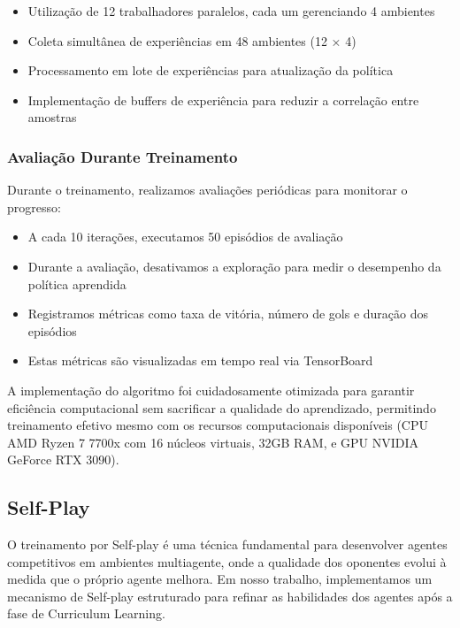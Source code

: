 \begin{itemize}
    \item Utilização de 12 trabalhadores paralelos, cada um gerenciando 4 ambientes
    \item Coleta simultânea de experiências em 48 ambientes (12 × 4)
    \item Processamento em lote de experiências para atualização da política
    \item Implementação de buffers de experiência para reduzir a correlação entre amostras
\end{itemize}

\subsubsection{Avaliação Durante Treinamento}

Durante o treinamento, realizamos avaliações periódicas para monitorar o progresso:

\begin{itemize}
    \item A cada 10 iterações, executamos 50 episódios de avaliação
    \item Durante a avaliação, desativamos a exploração para medir o desempenho da política aprendida
    \item Registramos métricas como taxa de vitória, número de gols e duração dos episódios
    \item Estas métricas são visualizadas em tempo real via TensorBoard
\end{itemize}

A implementação do algoritmo foi cuidadosamente otimizada para garantir eficiência computacional sem sacrificar a qualidade do aprendizado, permitindo treinamento efetivo mesmo com os recursos computacionais disponíveis (CPU AMD Ryzen 7 7700x com 16 núcleos virtuais, 32GB RAM, e GPU NVIDIA GeForce RTX 3090).

\subsection{Self-Play}

O treinamento por Self-play é uma técnica fundamental para desenvolver agentes competitivos em ambientes multiagente, onde a qualidade dos oponentes evolui à medida que o próprio agente melhora. Em nosso trabalho, implementamos um mecanismo de Self-play estruturado para refinar as habilidades dos agentes após a fase de Curriculum Learning.

